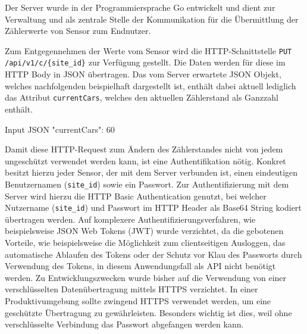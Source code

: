 Der Server wurde in der Programmiersprache Go entwickelt und dient zur Verwaltung und als zentrale Stelle der Kommunikation für die Übermittlung der Zählerwerte von Sensor zum Endnutzer.

Zum Entgegennehmen der Werte vom Sensor wird die HTTP-Schnittstelle \lstinline|PUT /api/v1/c/{site_id}| zur Verfügung gestellt.
Die Daten werden für diese im HTTP Body in JSON übertragen.
Das vom Server erwartete JSON Objekt, welches nachfolgenden beispielhaft dargestellt ist, enthält dabei aktuell lediglich das Attribut \lstinline|currentCars|, welches den aktuellen Zählerstand als Ganzzahl enthält.

\lstset{language=json, numbers=none}
\begin{center}
    \begin{mylisting}{Input JSON}
{
    "currentCars": 60
}
    \end{mylisting}
\end{center}

Damit diese HTTP-Request zum Ändern des Zählerstandes nicht von jedem ungeschützt verwendet werden kann, ist eine Authentifikation nötig.
Konkret besitzt hierzu jeder Sensor, der mit dem Server verbunden ist, einen eindeutigen Benutzernamen (\lstinline|site_id|) sowie ein Passwort.
Zur Authentifizierung mit dem Server wird hierzu die HTTP Basic Authentication genutzt, bei welcher Nutzername (\lstinline|site_id|) und Passwort im HTTP Header als Base64 String kodiert übertragen werden.
Auf komplexere Authentifizierungsverfahren, wie beispielsweise JSON Web Tokens (JWT) wurde verzichtet, da die gebotenen Vorteile, wie beispielsweise die Möglichkeit zum clientseitigen Ausloggen, das automatische Ablaufen des Tokens oder der Schutz vor Klau des Passworts durch Verwendung des Tokens, in diesem Anwendungsfall als API nicht benötigt werden.
Zu Entwicklungszwecken wurde bisher auf die Verwendung von einer verschlüsselten Datenübertragung mittels HTTPS verzichtet.
In einer Produktivumgebung sollte zwingend HTTPS verwendet werden, um eine geschützte Übertragung zu gewährleisten.
Besonders wichtig ist dies, weil ohne verschlüsselte Verbindung das Passwort abgefangen werden kann.


